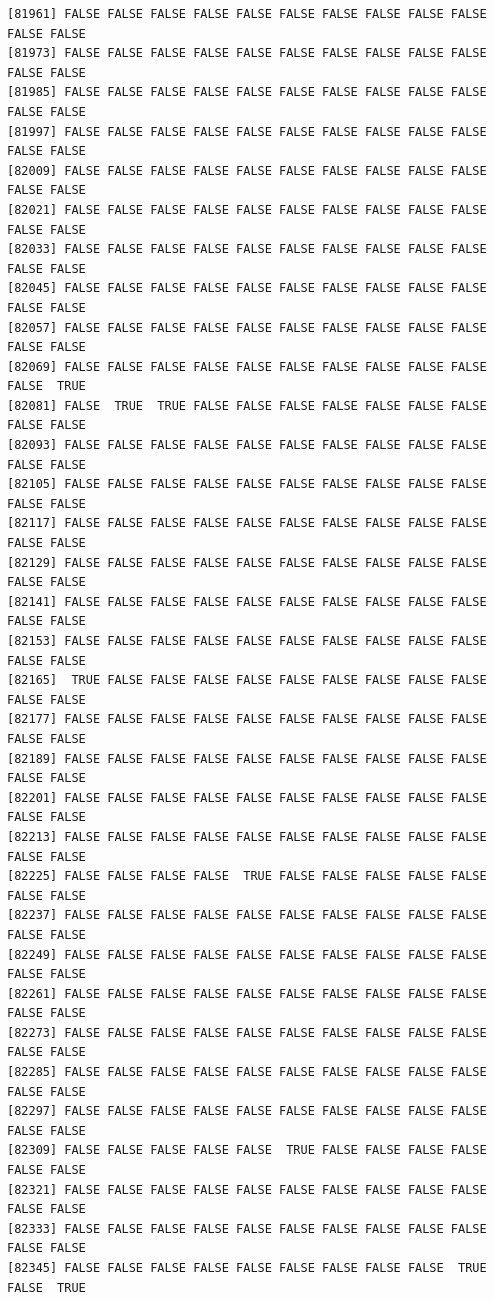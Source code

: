 \documentclass[
  a4paper,
  DIV=11,
  numbers=noendperiod]{scrartcl}
\begin{document}
\begin{verbatim}
[81961] FALSE FALSE FALSE FALSE FALSE FALSE FALSE FALSE FALSE FALSE FALSE FALSE
[81973] FALSE FALSE FALSE FALSE FALSE FALSE FALSE FALSE FALSE FALSE FALSE FALSE
[81985] FALSE FALSE FALSE FALSE FALSE FALSE FALSE FALSE FALSE FALSE FALSE FALSE
[81997] FALSE FALSE FALSE FALSE FALSE FALSE FALSE FALSE FALSE FALSE FALSE FALSE
[82009] FALSE FALSE FALSE FALSE FALSE FALSE FALSE FALSE FALSE FALSE FALSE FALSE
[82021] FALSE FALSE FALSE FALSE FALSE FALSE FALSE FALSE FALSE FALSE FALSE FALSE
[82033] FALSE FALSE FALSE FALSE FALSE FALSE FALSE FALSE FALSE FALSE FALSE FALSE
[82045] FALSE FALSE FALSE FALSE FALSE FALSE FALSE FALSE FALSE FALSE FALSE FALSE
[82057] FALSE FALSE FALSE FALSE FALSE FALSE FALSE FALSE FALSE FALSE FALSE FALSE
[82069] FALSE FALSE FALSE FALSE FALSE FALSE FALSE FALSE FALSE FALSE FALSE  TRUE
[82081] FALSE  TRUE  TRUE FALSE FALSE FALSE FALSE FALSE FALSE FALSE FALSE FALSE
[82093] FALSE FALSE FALSE FALSE FALSE FALSE FALSE FALSE FALSE FALSE FALSE FALSE
[82105] FALSE FALSE FALSE FALSE FALSE FALSE FALSE FALSE FALSE FALSE FALSE FALSE
[82117] FALSE FALSE FALSE FALSE FALSE FALSE FALSE FALSE FALSE FALSE FALSE FALSE
[82129] FALSE FALSE FALSE FALSE FALSE FALSE FALSE FALSE FALSE FALSE FALSE FALSE
[82141] FALSE FALSE FALSE FALSE FALSE FALSE FALSE FALSE FALSE FALSE FALSE FALSE
[82153] FALSE FALSE FALSE FALSE FALSE FALSE FALSE FALSE FALSE FALSE FALSE FALSE
[82165]  TRUE FALSE FALSE FALSE FALSE FALSE FALSE FALSE FALSE FALSE FALSE FALSE
[82177] FALSE FALSE FALSE FALSE FALSE FALSE FALSE FALSE FALSE FALSE FALSE FALSE
[82189] FALSE FALSE FALSE FALSE FALSE FALSE FALSE FALSE FALSE FALSE FALSE FALSE
[82201] FALSE FALSE FALSE FALSE FALSE FALSE FALSE FALSE FALSE FALSE FALSE FALSE
[82213] FALSE FALSE FALSE FALSE FALSE FALSE FALSE FALSE FALSE FALSE FALSE FALSE
[82225] FALSE FALSE FALSE FALSE  TRUE FALSE FALSE FALSE FALSE FALSE FALSE FALSE
[82237] FALSE FALSE FALSE FALSE FALSE FALSE FALSE FALSE FALSE FALSE FALSE FALSE
[82249] FALSE FALSE FALSE FALSE FALSE FALSE FALSE FALSE FALSE FALSE FALSE FALSE
[82261] FALSE FALSE FALSE FALSE FALSE FALSE FALSE FALSE FALSE FALSE FALSE FALSE
[82273] FALSE FALSE FALSE FALSE FALSE FALSE FALSE FALSE FALSE FALSE FALSE FALSE
[82285] FALSE FALSE FALSE FALSE FALSE FALSE FALSE FALSE FALSE FALSE FALSE FALSE
[82297] FALSE FALSE FALSE FALSE FALSE FALSE FALSE FALSE FALSE FALSE FALSE FALSE
[82309] FALSE FALSE FALSE FALSE FALSE  TRUE FALSE FALSE FALSE FALSE FALSE FALSE
[82321] FALSE FALSE FALSE FALSE FALSE FALSE FALSE FALSE FALSE FALSE FALSE FALSE
[82333] FALSE FALSE FALSE FALSE FALSE FALSE FALSE FALSE FALSE FALSE FALSE FALSE
[82345] FALSE FALSE FALSE FALSE FALSE FALSE FALSE FALSE FALSE  TRUE FALSE  TRUE

\end{verbatim}
\end{document}
